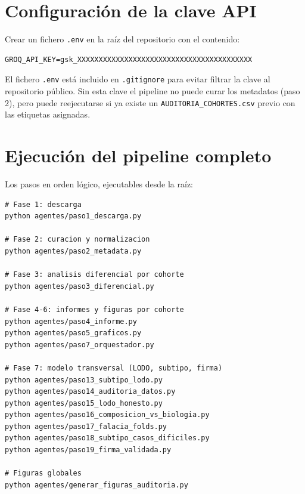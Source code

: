 \section*{Configuración de la clave API}
{}

Crear un fichero \texttt{.env} en la raíz del repositorio con el
contenido:

\begin{lstlisting}[caption={Fichero .env de configuración.}]
GROQ_API_KEY=gsk_XXXXXXXXXXXXXXXXXXXXXXXXXXXXXXXXXXXXXXXXX
\end{lstlisting}

El fichero \texttt{.env} está incluido en \texttt{.gitignore} para
evitar filtrar la clave al repositorio público. Sin esta clave el
pipeline no puede curar los metadatos (paso 2), pero puede reejecutarse
si ya existe un \texttt{AUDITORIA\_COHORTES.csv} previo con las
etiquetas asignadas.

\section*{Ejecución del pipeline completo}
{}

Los pasos en orden lógico, ejecutables desde la raíz:

\begin{lstlisting}[style=bash, caption={Reproducción end-to-end.}]
# Fase 1: descarga
python agentes/paso1_descarga.py

# Fase 2: curacion y normalizacion
python agentes/paso2_metadata.py

# Fase 3: analisis diferencial por cohorte
python agentes/paso3_diferencial.py

# Fase 4-6: informes y figuras por cohorte
python agentes/paso4_informe.py
python agentes/paso5_graficos.py
python agentes/paso7_orquestador.py

# Fase 7: modelo transversal (LODO, subtipo, firma)
python agentes/paso13_subtipo_lodo.py
python agentes/paso14_auditoria_datos.py
python agentes/paso15_lodo_honesto.py
python agentes/paso16_composicion_vs_biologia.py
python agentes/paso17_falacia_folds.py
python agentes/paso18_subtipo_casos_dificiles.py
python agentes/paso19_firma_validada.py

# Figuras globales
python agentes/generar_figuras_auditoria.py
\end{lstlisting}

